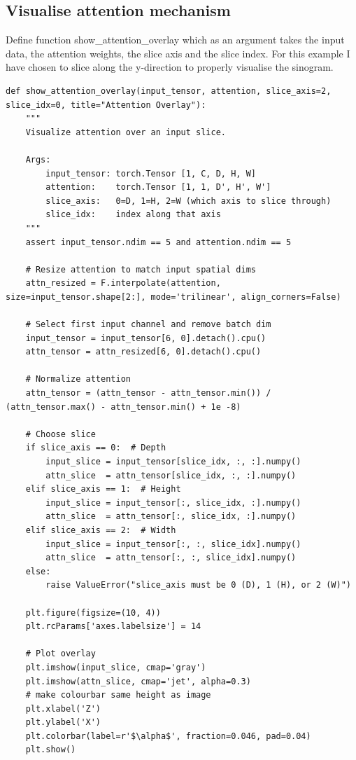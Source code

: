 \subsection{Visualise attention mechanism}

Define function show\_attention\_overlay which as an argument takes the input data, the attention weights, the slice axis and the slice index.
For this example I have chosen to slice along the y-direction to properly visualise the sinogram.

\begin{verbatim}
def show_attention_overlay(input_tensor, attention, slice_axis=2, slice_idx=0, title="Attention Overlay"):
    """
    Visualize attention over an input slice.

    Args:
        input_tensor: torch.Tensor [1, C, D, H, W]
        attention:    torch.Tensor [1, 1, D', H', W']
        slice_axis:   0=D, 1=H, 2=W (which axis to slice through)
        slice_idx:    index along that axis
    """
    assert input_tensor.ndim == 5 and attention.ndim == 5

    # Resize attention to match input spatial dims
    attn_resized = F.interpolate(attention, size=input_tensor.shape[2:], mode='trilinear', align_corners=False)

    # Select first input channel and remove batch dim
    input_tensor = input_tensor[6, 0].detach().cpu()
    attn_tensor = attn_resized[6, 0].detach().cpu()
    
    # Normalize attention
    attn_tensor = (attn_tensor - attn_tensor.min()) / (attn_tensor.max() - attn_tensor.min() + 1e -8)

    # Choose slice
    if slice_axis == 0:  # Depth
        input_slice = input_tensor[slice_idx, :, :].numpy()
        attn_slice  = attn_tensor[slice_idx, :, :].numpy()
    elif slice_axis == 1:  # Height
        input_slice = input_tensor[:, slice_idx, :].numpy()
        attn_slice  = attn_tensor[:, slice_idx, :].numpy()
    elif slice_axis == 2:  # Width
        input_slice = input_tensor[:, :, slice_idx].numpy()
        attn_slice  = attn_tensor[:, :, slice_idx].numpy()
    else:
        raise ValueError("slice_axis must be 0 (D), 1 (H), or 2 (W)")

    plt.figure(figsize=(10, 4))
    plt.rcParams['axes.labelsize'] = 14

    # Plot overlay
    plt.imshow(input_slice, cmap='gray')
    plt.imshow(attn_slice, cmap='jet', alpha=0.3)
    # make colourbar same height as image
    plt.xlabel('Z')
    plt.ylabel('X')
    plt.colorbar(label=r'$\alpha$', fraction=0.046, pad=0.04)
    plt.show()
\end{verbatim}

